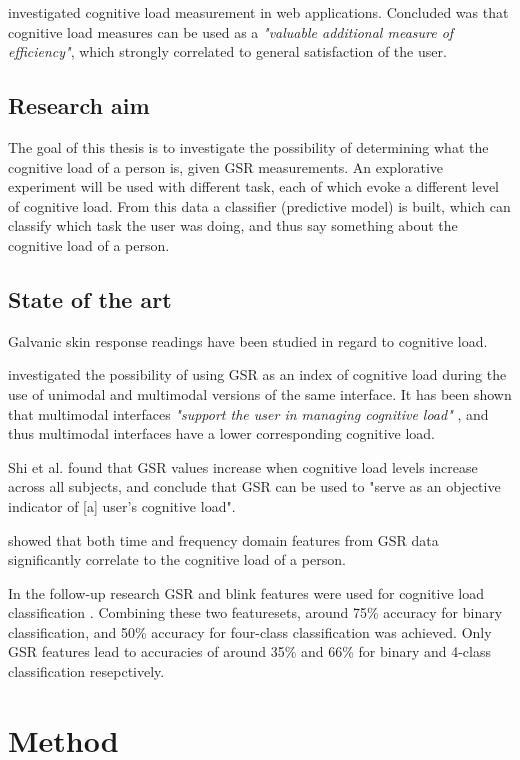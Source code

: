 \documentclass[11pt,leqno,letterpaper]{report} %
\begin{document}
\citep{Schmutz2009} investigated cognitive load measurement in web applications. Concluded was that cognitive load measures can be used as a \textit{"valuable additional measure of efficiency"}, which strongly correlated to general satisfaction of the user. 



\section{Research aim}
The goal of this thesis is to investigate the possibility of determining what the cognitive load of a person is, given GSR measurements. An explorative experiment will be used with different task, each of which evoke a different level of cognitive load. From this data a classifier (predictive model) is built, which can classify which task the user was doing, and thus say something about the cognitive load of a person.

\section{State of the art}
Galvanic skin response readings have been studied in regard to cognitive load.

\citep{Shi2007} investigated the possibility of using GSR as an index of cognitive load during the use of unimodal and multimodal versions of the same interface. It has been shown that multimodal interfaces \textit{"support the user in managing cognitive load"} \citep{Oviatt2004}, and thus multimodal interfaces have a lower corresponding cognitive load. 

Shi et al. found that GSR values increase when cognitive load levels increase across all subjects, and conclude that GSR can be used to "serve as an objective indicator of [a] user's cognitive load".

\citep{Nourbakhsh2012} showed that both time and frequency domain features from GSR data significantly correlate to the cognitive load of a person.

In the follow-up research GSR and blink features were used for cognitive load classification \citep{Nourbakhsh2013}. Combining these two featuresets, around 75\% accuracy for binary classification, and 50\% accuracy for four-class classification was achieved. Only GSR features lead to accuracies of around 35\% and 66\% for binary and 4-class classification resepctively.



\chapter{Method}
\end{document}
